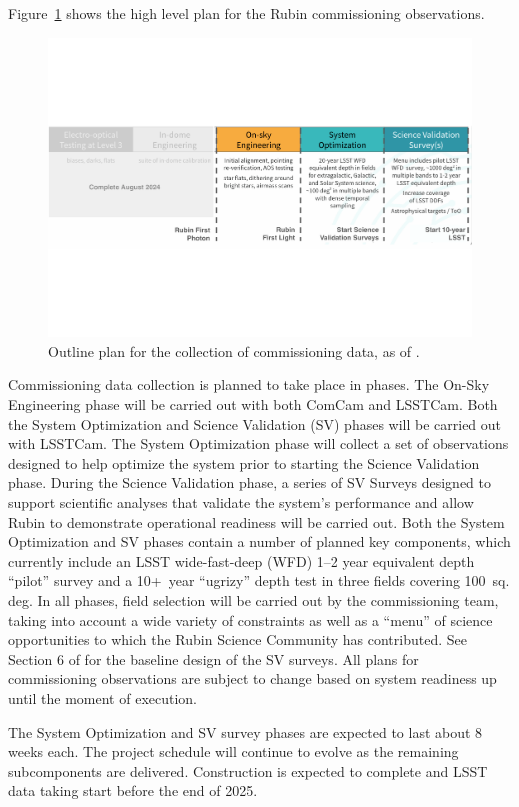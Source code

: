 Figure~\ref{fig:commissioning} shows the high level plan for the Rubin commissioning observations. 
\begin{figure}[htb]
\centering
\includegraphics[width=0.95\linewidth]{figures/commissioning-plan}
\caption{Outline plan for the collection of commissioning data, as of \currentdate.}
\label{fig:commissioning}
\end{figure}
Commissioning data collection is planned to take place in phases.
The On-Sky Engineering phase will be carried out with both ComCam and LSSTCam.
Both the System Optimization and Science Validation (SV) phases will be carried out with LSSTCam. 
The System Optimization phase will collect a set of observations designed to help optimize the system prior to starting the Science Validation phase.
During the Science Validation phase, a series of SV Surveys designed to support scientific analyses that validate the system's performance and allow Rubin to demonstrate operational readiness will be carried out.
Both the System Optimization and SV phases contain a number of planned key components, which currently include an LSST wide-fast-deep (WFD) 1--2 year equivalent depth ``pilot'' survey and a 
10+~year ``ugrizy'' depth test in three fields covering 100~sq. deg.
In all phases, field selection will be carried out by the commissioning team, taking into account a wide variety of constraints as well as a ``menu'' of science opportunities to which the Rubin Science Community has contributed.
See Section 6 of  for the baseline design of the SV surveys.
All plans for commissioning observations are subject to change based on system readiness up until the moment of execution. 

The System Optimization and SV survey phases are expected to last about 8 weeks each.
The project schedule will continue to evolve as the remaining subcomponents are delivered. 
Construction is expected to complete and LSST data taking start before the end of 2025.

